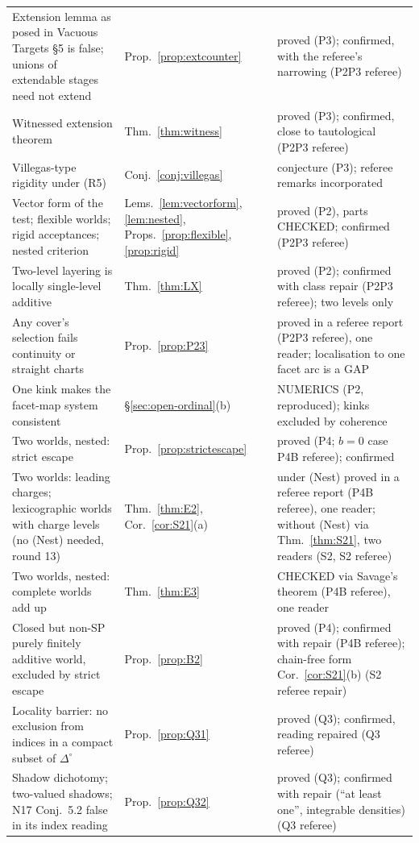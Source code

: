 \documentclass[11pt]{article}
\theoremstyle{definition}
\theoremstyle{remark}
\newcommand{\Di}{\Delta^{\circ}}
\begin{document}
{\begin{longtable}{>{\raggedright\arraybackslash}p{6.4cm}>{\raggedright\arraybackslash}p{2.1cm}>{\raggedright\arraybackslash}p{5.6cm}}
Extension lemma as posed in Vacuous Targets \S5 is false; unions of extendable stages need not extend & Prop.~\ref{prop:extcounter} & proved (P3); confirmed, with the referee's narrowing (P2P3 referee)\\
Witnessed extension theorem & Thm.~\ref{thm:witness} & proved (P3); confirmed, close to tautological (P2P3 referee)\\
Villegas-type rigidity under (R5) & Conj.~\ref{conj:villegas} & conjecture (P3); referee remarks incorporated\\
Vector form of the test; flexible worlds; rigid acceptances; nested criterion & Lems.~\ref{lem:vectorform}, \ref{lem:nested}, Props.~\ref{prop:flexible}, \ref{prop:rigid} & proved (P2), parts CHECKED; confirmed (P2P3 referee)\\
Two-level layering is locally single-level additive & Thm.~\ref{thm:LX} & proved (P2); confirmed with class repair (P2P3 referee); two levels only\\
Any cover's selection fails continuity or straight charts & Prop.~\ref{prop:P23} & proved in a referee report (P2P3 referee), one reader; localisation to one facet arc is a GAP\\
One kink makes the facet-map system consistent & \S\ref{sec:open-ordinal}(b) & NUMERICS (P2, reproduced); kinks excluded by coherence\\
Two worlds, nested: strict escape & Prop.~\ref{prop:strictescape} & proved (P4; $b=0$ case P4B referee); confirmed\\
Two worlds: leading charges; lexicographic worlds with charge levels (no (Nest) needed, round 13) & Thm.~\ref{thm:E2}, Cor.~\ref{cor:S21}(a) & under (Nest) proved in a referee report (P4B referee), one reader; without (Nest) via Thm.~\ref{thm:S21}, two readers (S2, S2 referee)\\
Two worlds, nested: complete worlds add up & Thm.~\ref{thm:E3} & CHECKED via Savage's theorem (P4B referee), one reader\\
Closed but non-SP purely finitely additive world, excluded by strict escape & Prop.~\ref{prop:B2} & proved (P4); confirmed with repair (P4B referee); chain-free form Cor.~\ref{cor:S21}(b) (S2 referee repair)\\
Locality barrier: no exclusion from indices in a compact subset of $\Di$ & Prop.~\ref{prop:Q31} & proved (Q3); confirmed, reading repaired (Q3 referee)\\
Shadow dichotomy; two-valued shadows; N17 Conj.~5.2 false in its index reading & Prop.~\ref{prop:Q32} & proved (Q3); confirmed with repair (``at least one'', integrable densities) (Q3 referee)\\

\end{longtable}}
\end{document}
